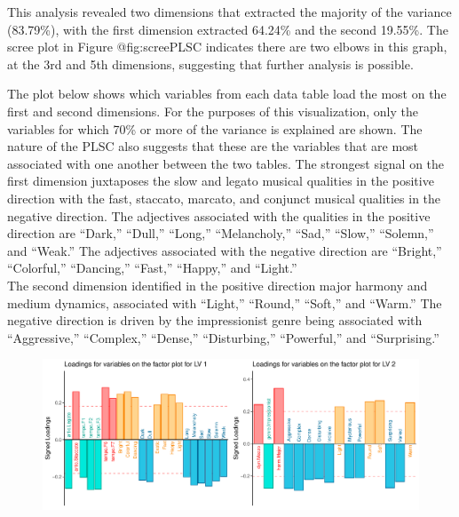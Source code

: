 \documentclass[
  english,
  man,floatsintext]{apa6}
\begin{document}
This analysis revealed two dimensions that extracted the majority of the variance (83.79\%), with the first dimension extracted 64.24\% and the second 19.55\%. The scree plot in Figure @fig:screePLSC indicates there are two elbows in this graph, at the 3rd and 5th dimensions, suggesting that further analysis is possible.

The plot below shows which variables from each data table load the most on the first and second dimensions. For the purposes of this visualization, only the variables for which 70\% or more of the variance is explained are shown. The nature of the PLSC also suggests that these are the variables that are most associated with one another between the two tables. The strongest signal on the first dimension juxtaposes the slow and legato musical qualities in the positive direction with the fast, staccato, marcato, and conjunct musical qualities in the negative direction. The adjectives associated with the qualities in the positive direction are ``Dark,'' ``Dull,'' ``Long,'' ``Melancholy,'' ``Sad,'' ``Slow,'' ``Solemn,'' and ``Weak.'' The adjectives associated with the negative direction are ``Bright,'' ``Colorful,'' ``Dancing,'' ``Fast,'' ``Happy,'' and ``Light.''\\
The second dimension identified in the positive direction major harmony and medium dynamics, associated with ``Light,'' ``Round,'' ``Soft,'' and ``Warm.'' The negative direction is driven by the impressionist genre being associated with ``Aggressive,'' ``Complex,'' ``Dense,'' ``Disturbing,'' ``Powerful,'' and ``Surprising.''

\begin{figure}

{\centering \includegraphics{Music-Descriptor-Space_files/figure-latex/loadingsplsc-1} 

}

\caption{ }\label{fig:loadingsplsc}
\end{figure}
\end{document}
